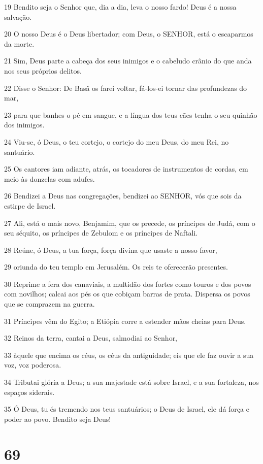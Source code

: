 \par 19 Bendito seja o Senhor que, dia a dia, leva o nosso fardo! Deus é a nossa salvação.
\par 20 O nosso Deus é o Deus libertador; com Deus, o SENHOR, está o escaparmos da morte.
\par 21 Sim, Deus parte a cabeça dos seus inimigos e o cabeludo crânio do que anda nos seus próprios delitos.
\par 22 Disse o Senhor: De Basã os farei voltar, fá-los-ei tornar das profundezas do mar,
\par 23 para que banhes o pé em sangue, e a língua dos teus cães tenha o seu quinhão dos inimigos.
\par 24 Viu-se, ó Deus, o teu cortejo, o cortejo do meu Deus, do meu Rei, no santuário.
\par 25 Os cantores iam adiante, atrás, os tocadores de instrumentos de cordas, em meio às donzelas com adufes.
\par 26 Bendizei a Deus nas congregações, bendizei ao SENHOR, vós que sois da estirpe de Israel.
\par 27 Ali, está o mais novo, Benjamim, que os precede, os príncipes de Judá, com o seu séquito, os príncipes de Zebulom e os príncipes de Naftali.
\par 28 Reúne, ó Deus, a tua força, força divina que usaste a nosso favor,
\par 29 oriunda do teu templo em Jerusalém. Os reis te oferecerão presentes.
\par 30 Reprime a fera dos canaviais, a multidão dos fortes como touros e dos povos com novilhos; calcai aos pés os que cobiçam barras de prata. Dispersa os povos que se comprazem na guerra.
\par 31 Príncipes vêm do Egito; a Etiópia corre a estender mãos cheias para Deus.
\par 32 Reinos da terra, cantai a Deus, salmodiai ao Senhor,
\par 33 àquele que encima os céus, os céus da antiguidade; eis que ele faz ouvir a sua voz, voz poderosa.
\par 34 Tributai glória a Deus; a sua majestade está sobre Israel, e a sua fortaleza, nos espaços siderais.
\par 35 Ó Deus, tu és tremendo nos teus santuários; o Deus de Israel, ele dá força e poder ao povo. Bendito seja Deus!

\chapter{69}

